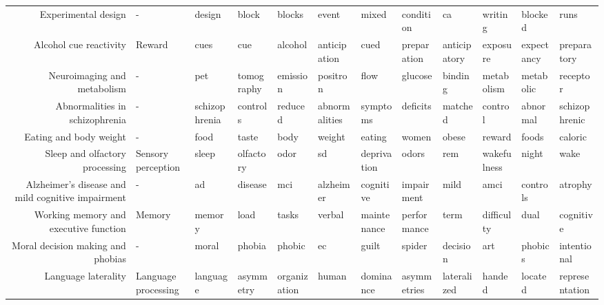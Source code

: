 \begin{tabular}{rlllllllllll}
                               Experimental design &                   - &           design &         block &          blocks &          event &       mixed &      condition &            ca &        writing &       blocked &           runs \\
                            Alcohol cue reactivity &              Reward &             cues &           cue &         alcohol &   anticipation &        cued &    preparation &  anticipatory &       exposure &    expectancy &    preparatory \\
                       Neuroimaging and metabolism &                   - &              pet &    tomography &        emission &       positron &        flow &        glucose &       binding &     metabolism &     metabolic &       receptor \\
                    Abnormalities in schizophrenia &                   - &    schizophrenia &      controls &         reduced &  abnormalities &    symptoms &       deficits &       matched &        control &      abnormal &  schizophrenic \\
                            Eating and body weight &                   - &             food &         taste &            body &         weight &      eating &          women &         obese &         reward &         foods &        caloric \\
                    Sleep and olfactory processing &  Sensory perception &            sleep &     olfactory &            odor &             sd & deprivation &          odors &           rem &    wakefulness &         night &           wake \\
 Alzheimer's disease and mild cognitive impairment &                   - &               ad &       disease &             mci &      alzheimer &   cognitive &     impairment &          mild &           amci &      controls &        atrophy \\
             Working memory and executive function &              Memory &           memory &          load &           tasks &         verbal & maintenance &    performance &          term &     difficulty &          dual &      cognitive \\
                 Moral decision making and phobias &                   - &            moral &        phobia &          phobic &             ec &       guilt &         spider &      decision &            art &       phobics &    intentional \\
                               Language laterality & Language processing &         language &     asymmetry &    organization &          human &   dominance &    asymmetries &   lateralized &         handed &       located & representation \\

\end{tabular}

